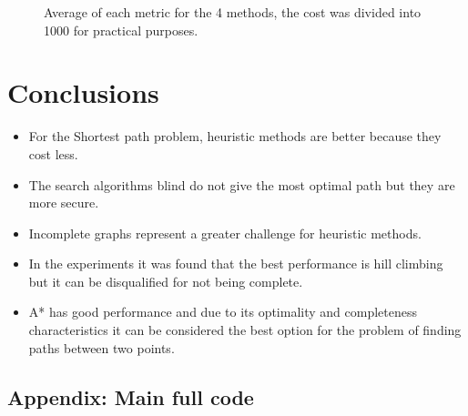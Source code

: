 \documentclass[11pt]{article}
\begin{document}
\begin{figure}[ht]
\centering
{}
\caption{Average of each metric for the 4 methods, the cost was divided into 1000 for practical purposes.}
\end{figure}
\section{Conclusions}
\begin{itemize}
    \item For the Shortest path problem, heuristic methods are better because they cost less.
    \item The search algorithms blind do not give the most optimal path but they are more secure.
    \item Incomplete graphs represent a greater challenge for heuristic methods.
    \item In the experiments it was found that the best performance is hill climbing but it can be disqualified for not being complete.
    \item A* has good performance and due to its optimality and completeness characteristics it can be considered the best option for the problem of finding paths between two points.
\end{itemize}



\clearpage

\begin{appendices}
  \section{Appendix: Main full code}
  \label{appendix:main}
  
\end{appendices}

\end{document}
